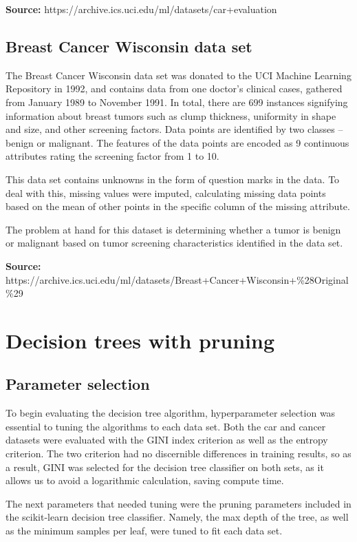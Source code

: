 \documentclass{article}
\begin{document}
    \textbf{Source:} https://archive.ics.uci.edu/ml/datasets/car+evaluation

    \subsection{Breast Cancer Wisconsin data set}
    The Breast Cancer Wisconsin data set was donated to the UCI Machine Learning Repository in 1992, and contains data from one doctor's clinical cases, gathered from January 1989 to November 1991. In total, there are 699 instances signifying information about breast tumors such as clump thickness, uniformity in shape and size, and other screening factors. Data points are identified by two classes -- benign or malignant. The features of the data points are encoded as 9 continuous attributes rating the screening factor from 1 to 10.

    This data set contains unknowns in the form of question marks in the data. To deal with this, missing values were imputed, calculating missing data points based on the mean of other points in the specific column of the missing attribute. 

    The problem at hand for this dataset is determining whether a tumor is benign or malignant based on tumor screening characteristics identified in the data set.

    \textbf{Source:} https://archive.ics.uci.edu/ml/datasets/Breast+Cancer+Wisconsin+\%28Original\%29

    \section{Decision trees with pruning}

    \subsection{Parameter selection}
    To begin evaluating the decision tree algorithm, hyperparameter selection was essential to tuning the algorithms to each data set. Both the car and cancer datasets were evaluated with the GINI index criterion as well as the entropy criterion. The two criterion had no discernible differences in training results, so as a result, GINI was selected for the decision tree classifier on both sets, as it allows us to avoid a logarithmic calculation, saving compute time.

    The next parameters that needed tuning were the pruning parameters included in the scikit-learn decision tree classifier. Namely, the max depth of the tree, as well as the minimum samples per leaf, were tuned to fit each data set.
\end{document}
